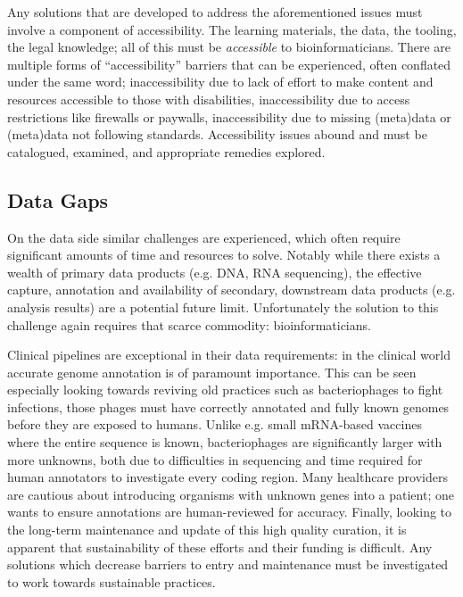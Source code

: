 Any solutions that are developed to address the aforementioned issues must involve a component of accessibility.
The learning materials\cite{Crane_2023,journals/corr/abs-2105-00076}, the data\cite{Tenopir_2011}, the tooling, the legal knowledge; all of this must be \emph{accessible} to bioinformaticians.
There are multiple forms of ``accessibility'' barriers that can be experienced, often conflated under the same word; inaccessibility due to lack of effort to make content and resources accessible to those with disabilities, inaccessibility due to access restrictions like firewalls or paywalls, inaccessibility due to missing (meta)data or (meta)data not following standards\cite{Roche_2015}.
Accessibility issues abound and must be catalogued, examined, and appropriate remedies explored.

\subsection{Data Gaps} %

On the data side similar challenges are experienced, which often require significant amounts of time and resources to solve. Notably while there exists a wealth of primary data products (e.g. DNA, RNA sequencing), the effective capture, annotation and availability of secondary, downstream data products (e.g. analysis results) are a potential future limit. Unfortunately the solution to this challenge again requires that scarce commodity: bioinformaticians.

Clinical pipelines are exceptional in their data requirements: in the clinical world accurate genome annotation is of paramount importance\cite{Roy_2018}.
This can be seen especially looking towards reviving old practices such as bacteriophages to fight infections, those phages must have correctly annotated and fully known genomes before they are exposed to humans\cite{Nilsson_2014,Philipson_2018}.
Unlike e.g. small mRNA-based vaccines where the entire sequence is known, bacteriophages are significantly larger with more unknowns, both due to difficulties in sequencing and time required for human annotators to investigate every coding region.
Many healthcare providers are cautious about introducing organisms with unknown genes into a patient; one wants to ensure annotations are human-reviewed for accuracy\cite{Pirnay_2015}.
Finally, looking to the long-term maintenance and update of this high quality curation, it is apparent that sustainability of these efforts and their funding is difficult\cite{Vaught_2011,Berardini_2015}. Any solutions which decrease barriers to entry and maintenance must be investigated to work towards sustainable practices.

